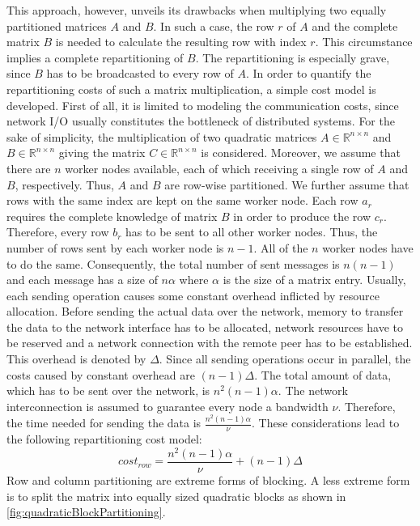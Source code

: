 This approach, however, unveils its drawbacks when multiplying two equally partitioned matrices $A$ and $B$. 
In such a case, the row $r$ of $A$ and the complete matrix $B$ is needed to calculate the resulting row with index $r$. 
This circumstance implies a complete repartitioning of $B$. 
The repartitioning is especially grave, since $B$ has to be broadcasted to every row of $A$. 
In order to quantify the repartitioning costs of such a matrix multiplication, a simple cost model is developed. 
First of all, it is limited to modeling the communication costs, since network I/O usually constitutes the bottleneck of distributed systems. 
For the sake of simplicity, the multiplication of two quadratic matrices $A \in \mathbb{R}^{n\times n}$ and $B \in \mathbb{R}^{n\times n}$ giving the matrix $C\in \mathbb{R}^{n \times n}$ is considered. 
Moreover, we assume that there are $n$ worker nodes available, each of which receiving a single row of $A$ and $B$, respectively. 
Thus, $A$ and $B$ are row-wise partitioned. 
We further assume that rows with the same index are kept on the same worker node. 
Each row $a_r$ requires the complete knowledge of matrix $B$ in order to produce the row $c_r$. 
Therefore, every row $b_r$ has to be sent to all other worker nodes. 
Thus, the number of rows sent by each worker node is $n-1$. 
All of the $n$ worker nodes have to do the same. 
Consequently, the total number of sent messages is $n(n-1)$ and each message has a size of $n\alpha$ where $\alpha$ is the size of a matrix entry. 
Usually, each sending operation causes some constant overhead inflicted by resource allocation. 
Before sending the actual data over the network, memory to transfer the data to the network interface has to be allocated, network resources have to be reserved and a network connection with the remote peer has to be established. 
This overhead is denoted by $\Delta$. 
Since all sending operations occur in parallel, the costs caused by constant overhead are $(n-1)\Delta$. 
The total amount of data, which has to be sent over the network, is $n^2(n-1)\alpha$. 
The network interconnection is assumed to guarantee every node a bandwidth $\nu$. 
Therefore, the time needed for sending the data is $\frac{n^2(n-1)\alpha}{\nu}$. 
These considerations lead to the following repartitioning cost model:
\begin{displaymath}
	cost_{row} = \frac{n^2(n-1)\alpha}{\nu} + (n-1)\Delta
\end{displaymath}
Row and column partitioning are extreme forms of blocking. 
A less extreme form is to split the matrix into equally sized quadratic blocks as shown in \cref{fig:quadraticBlockPartitioning}. 
